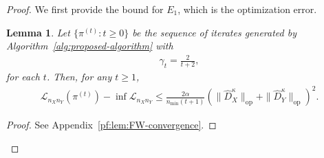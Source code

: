 \documentclass{article}
\newtheorem{lemma}{Lemma}
\begin{document}
\begin{proof}
	We first provide the bound for $E_1$, which is the optimization error.
	
	\begin{lemma}
		\label{lem:FW-convergence}
		Let $\{\pi^{(t)}: t \geq 0\}$ be the sequence of iterates generated by Algorithm~\ref{alg:proposed-algorithm} with
		\begin{align*}
			\gamma_t = \frac{2}{t+2} ,
		\end{align*}
		for each $t$. Then, for any $t \geq 1$,
		\begin{align*}
			\mathcal{L}_{n_Xn_Y}(\pi^{(t)}) - \inf\mathcal{L}_{n_Xn_Y} \leq \frac{2\alpha}{n_{\min}(t+1)} \left(\|\hat{D}_X^\kappa\|_{\mathrm{op}} + \|\hat{D}_Y^\kappa\|_{\mathrm{op}}\right)^2 .
		\end{align*}
	\end{lemma}
	\begin{proof}
		See Appendix~\ref{pf:lem:FW-convergence}.
	\end{proof}
	

\end{proof}
\end{document}
